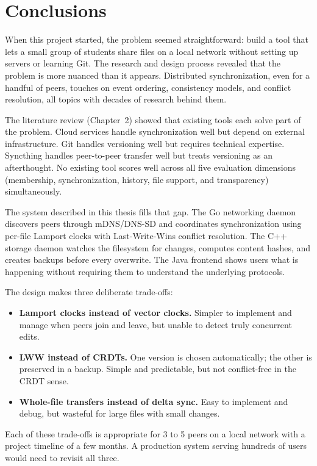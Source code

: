 \chapter{Conclusions}

When this project started, the problem seemed straightforward: build a tool that lets a small group of students share files on a local network without setting up servers or learning Git. The research and design process revealed that the problem is more nuanced than it appears. Distributed synchronization, even for a handful of peers, touches on event ordering, consistency models, and conflict resolution, all topics with decades of research behind them.

The literature review (Chapter~2) showed that existing tools each solve part of the problem. Cloud services handle synchronization well but depend on external infrastructure. Git handles versioning well but requires technical expertise. Syncthing handles peer-to-peer transfer well but treats versioning as an afterthought. No existing tool scores well across all five evaluation dimensions (membership, synchronization, history, file support, and transparency) simultaneously.

The system described in this thesis fills that gap. The Go networking daemon discovers peers through mDNS/DNS-SD and coordinates synchronization using per-file Lamport clocks with Last-Write-Wins conflict resolution. The C++ storage daemon watches the filesystem for changes, computes content hashes, and creates backups before every overwrite. The Java frontend shows users what is happening without requiring them to understand the underlying protocols.

The design makes three deliberate trade-offs:

\begin{itemize}
    \item \textbf{Lamport clocks instead of vector clocks.} Simpler to implement and manage when peers join and leave, but unable to detect truly concurrent edits.
    \item \textbf{LWW instead of CRDTs.} One version is chosen automatically; the other is preserved in a backup. Simple and predictable, but not conflict-free in the CRDT sense.
    \item \textbf{Whole-file transfers instead of delta sync.} Easy to implement and debug, but wasteful for large files with small changes.
\end{itemize}

Each of these trade-offs is appropriate for 3 to 5 peers on a local network with a project timeline of a few months. A production system serving hundreds of users would need to revisit all three.

